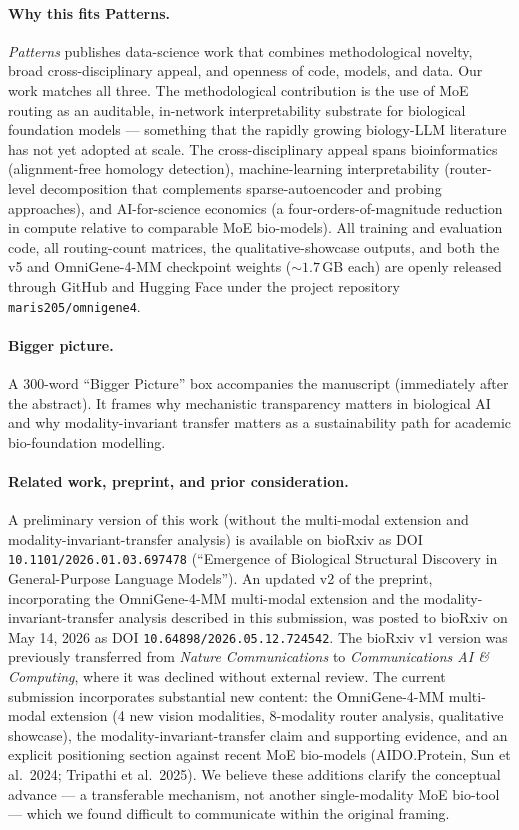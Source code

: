\documentclass[11pt]{article}
\begin{document}
\paragraph{Why this fits Patterns.}
\textit{Patterns} publishes data-science work that combines methodological novelty, broad cross-disciplinary appeal, and openness of code, models, and data. Our work matches all three. The methodological contribution is the use of MoE routing as an auditable, in-network interpretability substrate for biological foundation models --- something that the rapidly growing biology-LLM literature has not yet adopted at scale. The cross-disciplinary appeal spans bioinformatics (alignment-free homology detection), machine-learning interpretability (router-level decomposition that complements sparse-autoencoder and probing approaches), and AI-for-science economics (a four-orders-of-magnitude reduction in compute relative to comparable MoE bio-models). All training and evaluation code, all routing-count matrices, the qualitative-showcase outputs, and both the v5 and OmniGene-4-MM checkpoint weights ($\sim 1.7$\,GB each) are openly released through GitHub and Hugging Face under the project repository \texttt{maris205/omnigene4}.

\paragraph{Bigger picture.}
A 300-word ``Bigger Picture'' box accompanies the manuscript (immediately after the abstract). It frames why mechanistic transparency matters in biological AI and why modality-invariant transfer matters as a sustainability path for academic bio-foundation modelling.

\paragraph{Related work, preprint, and prior consideration.}
A preliminary version of this work (without the multi-modal extension and modality-invariant-transfer analysis) is available on bioRxiv as DOI \texttt{10.1101/2026.01.03.697478} (``Emergence of Biological Structural Discovery in General-Purpose Language Models''). An updated v2 of the preprint, incorporating the OmniGene-4-MM multi-modal extension and the modality-invariant-transfer analysis described in this submission, was posted to bioRxiv on May 14, 2026 as DOI \texttt{10.64898/2026.05.12.724542}. The bioRxiv v1 version was previously transferred from \textit{Nature Communications} to \textit{Communications AI \& Computing}, where it was declined without external review. The current submission incorporates substantial new content: the OmniGene-4-MM multi-modal extension (4 new vision modalities, 8-modality router analysis, qualitative showcase), the modality-invariant-transfer claim and supporting evidence, and an explicit positioning section against recent MoE bio-models (AIDO.Protein, Sun et al.\ 2024; Tripathi et al.\ 2025). We believe these additions clarify the conceptual advance --- a transferable mechanism, not another single-modality MoE bio-tool --- which we found difficult to communicate within the original framing.
\end{document}
